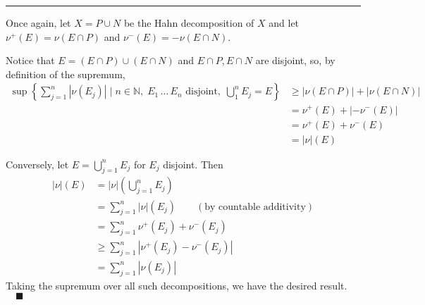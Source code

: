 \documentclass[12pt]{article}
\newcommand{\N}{\mathbb{N}}
\newcommand{\qed}{\quad \blacksquare}
\newcommand{\abs}[1]{\left\vert #1 \right\vert}
\renewcommand{\div}{\vspace*{10pt}\hrule\vspace*{10pt}}
\begin{document}
        \div

        Once again, let $X = P \cup N$ be the Hahn decomposition of $X$ and let $\nu^+(E) = \nu(E \cap P)$ and $\nu^-(E) = -\nu(E \cap N)$.

        Notice that $E = (E \cap P) \cup (E \cap N)$ and $E \cap P, E \cap N$ are disjoint, so, by definition of the supremum,
        \begin{align*}
            \sup \left\{\sum_{j=1}^n \abs{\nu(E_j)} \; \bigg\vert \; n \in \N,\; E_1\, \dots\, E_n  \text{ disjoint}, \; \bigcup_1^n E_j = E\right\} &\geq \abs{\nu(E \cap P)} + \abs{\nu(E \cap N)}\\ 
            &= \nu^+(E) + \abs{-\nu^-(E)}\\ 
            &= \nu^+(E) + \nu^-(E)\\ 
            &= \abs{\nu}(E)
        \end{align*}

        Conversely, let $E = \bigcup_{j=1}^n E_j$ for $E_j$ disjoint. Then 
        \begin{align*}
            \abs{\nu}(E) &= \abs{\nu}\left(\bigcup_{j=1}^n E_j\right)\\
                &= \sum_{j=1}^n \abs{\nu}(E_j) \qquad (\text{by countable additivity})\\
                &= \sum_{j=1}^n \nu^+(E_j) + \nu^-(E_j)\\
                &\geq \sum_{j=1}^n \abs{\nu^+(E_j) - \nu^-(E_j)}\\ 
                &= \sum_{j=1}^n \abs{\nu(E_j)}
        \end{align*}
        Taking the supremum over all such decompositions, we have the desired result. $\qed$
        


    \color{black}
\end{document}
